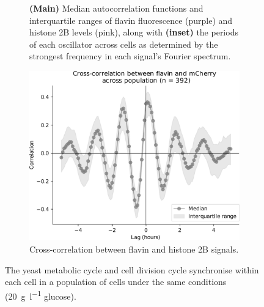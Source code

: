 \begin{figure}
\begin{subfigure}[htpb]{0.4\textwidth}
   \caption{
     \textbf{(Main)} Median autocorrelation functions and interquartile ranges of flavin fluorescence (purple) and histone 2B levels (pink), %
     along with \textbf{(inset)} the periods of each oscillator across cells as determined by the strongest frequency in each signal's Fourier spectrum.
   }
   \label{fig:biology-highglc-sync-acf}
  \end{subfigure}

  \begin{subfigure}[htpb]{0.4\textwidth}
   \centering
   \includegraphics[width=\textwidth]{xcf_edit.pdf}
   \caption{
    Cross-correlation between flavin and histone 2B signals.%
   }
   \label{fig:biology-highglc-sync-xcf}
  \end{subfigure}

  \caption{
    The yeast metabolic cycle and cell division cycle synchronise within each cell in a population of cells under the same conditions (\SI{20}{\gram~\litre^{-1}} glucose).
  }
  \label{fig:biology-highglc-sync}
\end{figure}

